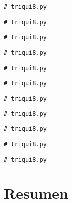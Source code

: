 \beforeverb
\begin{verbatim}
# triqui8.py
\end{verbatim}
\afterverb

\beforeverb
\begin{verbatim}
# triqui8.py
\end{verbatim}
\afterverb

\beforeverb
\begin{verbatim}
# triqui8.py
\end{verbatim}
\afterverb

\beforeverb
\begin{verbatim}
# triqui8.py
\end{verbatim}
\afterverb

\beforeverb
\begin{verbatim}
# triqui8.py
\end{verbatim}
\afterverb

\beforeverb
\begin{verbatim}
# triqui8.py
\end{verbatim}
\afterverb

\beforeverb
\begin{verbatim}
# triqui8.py
\end{verbatim}
\afterverb

\beforeverb
\begin{verbatim}
# triqui8.py
\end{verbatim}
\afterverb

\beforeverb
\begin{verbatim}
# triqui8.py
\end{verbatim}
\afterverb

\beforeverb
\begin{verbatim}
# triqui8.py
\end{verbatim}
\afterverb

\beforeverb
\begin{verbatim}
# triqui8.py
\end{verbatim}
\afterverb

\section{Resumen}


